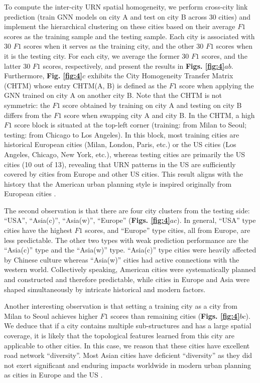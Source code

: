 \documentclass[10pt]{wlscirep}
\begin{document}
To compute the inter-city URN spatial homogeneity, we perform cross-city link prediction (train GNN models on city A and test on city B across 30 cities) and implement the hierarchical clustering on these cities based on their average $F1$ scores as the training sample and the testing sample. Each city is associated with 30 $F1$ scores when it serves as the training city, and the other 30 $F1$ scores when it is the testing city. For each city, we average the former 30 $F1$ scores, and the latter 30 $F1$ scores, respectively, and present the results in \textbf{Figs. \ref{fig:4}$ab$}. Furthermore, \textbf{Fig. \ref{fig:4}$c$} exhibits the City Homogeneity Transfer Matrix (CHTM) whose entry CHTM(A, B) is defined as the $F1$ score when applying the GNN trained on city A on another city B. Note that the CHTM is not symmetric: the $F1$ score obtained by training on city A and testing on city B differs from the $F1$ score when swapping city A and city B. In the CHTM, a high $F1$ score block is situated at the top-left corner (training: from Milan to Seoul; testing: from Chicago to Los Angeles). In this block, most training cities are historical European cities (Milan, London, Paris, etc.) or the US cities (Los Angeles, Chicago, New York, etc.), whereas testing cities are primarily the US cities (10 out of 13), revealing that URN patterns in the US are sufficiently covered by cities from Europe and other US cities. This result aligns with the history that the American urban planning style is inspired originally from European cities \cite{peterson2009birth}. 

The second observation is that there are four city clusters from the testing side: “USA”, “Asia(c)”, “Asia(w)”, “Europe” (\textbf{Figs. \ref{fig:4}$ac$}). In general, “USA” type cities have the highest $F1$ scores, and “Europe” type cities, all from Europe, are less predictable. The other two types with weak prediction performance are the “Asia(c)” type and the “Asia(w)” type. “Asia(c)” type cities were heavily affected by Chinese culture whereas “Asia(w)” cities had active connections with the western world. Collectively speaking, American cities were systematically planned and constructed and therefore predictable, while cities in Europe and Asia were shaped simultaneously by intricate historical and modern factors.

Another interesting observation is that setting a training city as a city from Milan to Seoul achieves higher $F1$ scores than remaining cities (\textbf{Figs. \ref{fig:4}$bc$}). We deduce that if a city contains multiple sub-structures and has a large spatial coverage, it is likely that the topological features learned from this city are applicable to other cities. In this case, we reason that these cities have excellent road network “diversity”. Most Asian cities have deficient “diversity” as they did not exert significant and enduring impacts worldwide in modern urban planning as cities in Europe and the US \cite{peng2011urbanization}. 
\end{document}
